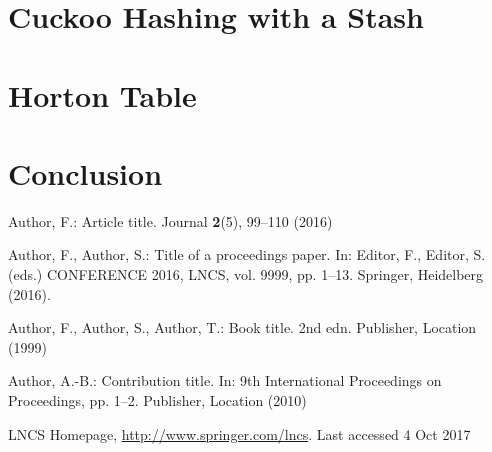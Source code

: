 \documentclass[runningheads]{llncs}
\begin{document}
\section{Cuckoo Hashing with a Stash}
\section{Horton Table}
\section{Conclusion}
%
%
%
% 
% 
%
\begin{thebibliography}{8}
Author, F.: Article title. Journal \textbf{2}(5), 99--110 (2016)

Author, F., Author, S.: Title of a proceedings paper. In: Editor,
F., Editor, S. (eds.) CONFERENCE 2016, LNCS, vol. 9999, pp. 1--13.
Springer, Heidelberg (2016). 

Author, F., Author, S., Author, T.: Book title. 2nd edn. Publisher,
Location (1999)

Author, A.-B.: Contribution title. In: 9th International Proceedings
on Proceedings, pp. 1--2. Publisher, Location (2010)

LNCS Homepage, \url{http://www.springer.com/lncs}. Last accessed 4
Oct 2017
\end{thebibliography}
\end{document}
